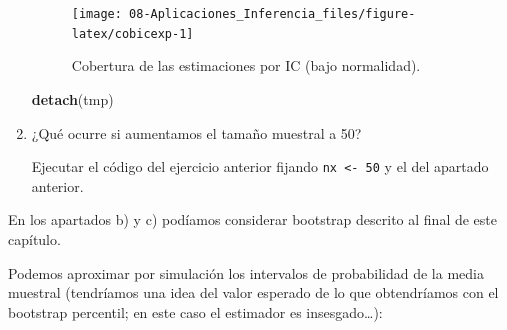 \documentclass[
]{book}
\newenvironment{Shaded}{\begin{snugshade}}{\end{snugshade}}
\newcommand{\KeywordTok}[1]{\textcolor[rgb]{0.13,0.29,0.53}{\textbf{#1}}}
\newcommand{\NormalTok}[1]{#1}
\theoremstyle{break}
\theoremstyle{definition}
\theoremstyle{definition}
\theoremstyle{definition}
\theoremstyle{remark}
\begin{document}
\begin{enumerate}
  \begin{figure}[!htb]

  {\centering \texttt{[image: 08-Aplicaciones\_Inferencia\_files/figure-latex/cobicexp-1]} 

  }

  \caption{Cobertura de las estimaciones por IC (bajo normalidad).}\label{fig:cobicexp}
  \end{figure}

\begin{Shaded}
\begin{Highlighting}[]
\KeywordTok{detach}\NormalTok{(tmp)}
\end{Highlighting}
\end{Shaded}
\item
  ¿Qué ocurre si aumentamos el tamaño muestral a 50?

  Ejecutar el código del ejercicio anterior fijando \texttt{nx\ \textless{}-\ 50}
  y el del apartado anterior.
\end{enumerate}

En los apartados b) y c) podíamos considerar bootstrap descrito al final de este capítulo.

Podemos aproximar por simulación los intervalos de probabilidad de la media muestral (tendríamos una idea del valor esperado de lo que obtendríamos
con el bootstrap percentil; en este caso el estimador es insesgado\ldots):
\end{document}
